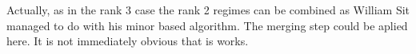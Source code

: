 \documentclass[10pt]{article}
\begin{document}
\newpage
Actually, as in the rank 3 case the rank 2 regimes can be combined as William Sit managed to
do with his minor based algorithm.  The merging step could be aplied here.  It is not immediately
obvious that is works.
 
%
%
%
%
\end{document}
